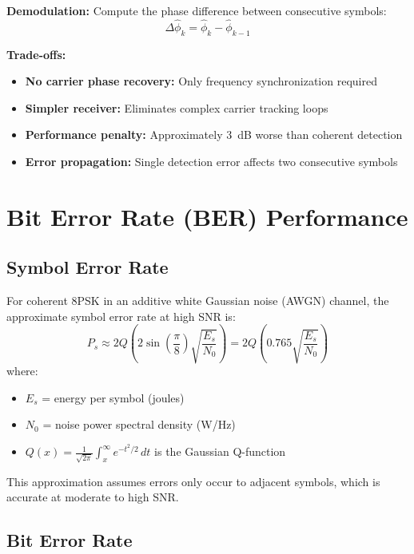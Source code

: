 \textbf{Demodulation:} Compute the phase difference between consecutive symbols:
\begin{equation}
\Delta\hat{\phi}_k = \hat{\phi}_k - \hat{\phi}_{k-1}
\end{equation}

\textbf{Trade-offs:}
\begin{itemize}
\item[\checkmark] \textbf{No carrier phase recovery:} Only frequency synchronization required
\item[\checkmark] \textbf{Simpler receiver:} Eliminates complex carrier tracking loops
\item[\texttimes] \textbf{Performance penalty:} Approximately 3~dB worse than coherent detection
\item[\texttimes] \textbf{Error propagation:} Single detection error affects two consecutive symbols
\end{itemize}

\section{Bit Error Rate (BER) Performance}

\subsection{Symbol Error Rate}

For coherent 8PSK in an additive white Gaussian noise (AWGN) channel, the approximate symbol error rate at high SNR is:
\begin{equation}
P_s \approx 2Q\left(2\sin\left(\frac{\pi}{8}\right)\sqrt{\frac{E_s}{N_0}}\right) = 2Q\left(0.765\sqrt{\frac{E_s}{N_0}}\right)
\end{equation}
where:
\begin{itemize}
\item $E_s$ = energy per symbol (joules)
\item $N_0$ = noise power spectral density (W/Hz)
\item $Q(x) = \frac{1}{\sqrt{2\pi}}\int_x^\infty e^{-t^2/2}\,dt$ is the Gaussian Q-function
\end{itemize}

This approximation assumes errors only occur to adjacent symbols, which is accurate at moderate to high SNR.

\subsection{Bit Error Rate}

